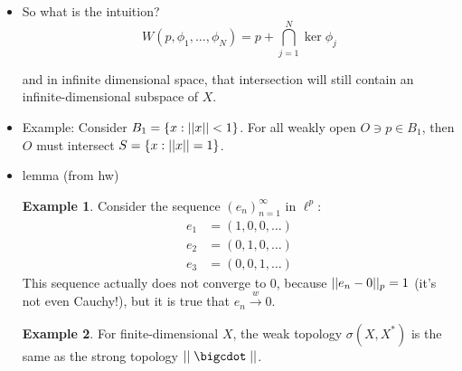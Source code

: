\documentclass[a5paper]{article}
\theoremstyle{definition}%
\newtheorem*{definition*}{Definition}
\newtheorem*{example*}{Example}
\numberwithin{exercise}{section}
\theoremstyle{remark}%
\begin{document}
\begin{itemize}
\begin{highlight}
\begin{definition*}
A \emph{weak neighborhood} is a basic open set in the weak topology, given by 
$$W(p,\phi_1, \dots, \phi_N)$$
which is all points whose $\phi_j$-value is within a certain quantity of $\phi_j(p)$ for all $j$.  
\end{definition*}
\end{highlight}
Note you can independently scale the radius and any of the functionals, so this will be some convex set, but otherwise is pretty general.

\begin{highlight}
\begin{definition*}
We denote the set $X$ with the \emph{weak topology} (whose basic open sets are above) by 
$$\sigma(X,X^*).$$
\end{definition*}
\end{highlight}

\item So what is the intuition? 
$$W(p,\phi_1, \dots, \phi_N) = p + \bigcap_{j=1}^N \ker\phi_j$$

and in infinite dimensional space, that intersection will still contain an infinite-dimensional subspace of $X$. 

\item Example: Consider $B_1 = \{x : ||x||<1\}$. For all weakly open $O\ni p\in B_1$, then $O$ must intersect $S=\{x: ||x||=1\}$. 

\item lemma (from hw)

\begin{highlight}
\begin{example*}
Consider the sequence $(e_n)_{n=1}^\infty$ in $\ell^p$:
\begin{align*}
e_1 &= (1,0,0,\dots) \\
e_2 &= (0,1,0,\dots) \\
e_3 &= (0,0,1,\dots)
\end{align*}
This sequence actually does not converge to 0, because $||e_n-0||_p=1$ (it's not even Cauchy!), but it is true that $e_n\xrightarrow{w}0$. 
\end{example*}
\end{highlight}

\begin{highlight}
\begin{example*}
For finite-dimensional $X$, the weak topology $\sigma(X,X^*)$ is the same as the strong topology $\norm{\;\cdot\;}$. 


\end{example*}
\end{highlight}
\end{itemize}
\end{document}
